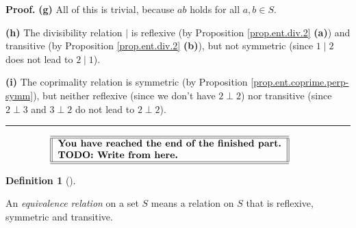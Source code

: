 \documentclass[numbers=enddot,12pt,final,onecolumn,notitlepage]{scrartcl}%
\numberwithin{exer}{subsection}
\theoremstyle{definition}
\newtheorem{defi}[theo]{Definition}
\newenvironment{definition}[1][]
{\begin{defi}[#1]\begin{leftbar}}
{\end{leftbar}\end{defi}}
\newenvironment{proof}[1][Proof]{\noindent\textbf{#1.} }{\ \rule{0.5em}{0.5em}}
\begin{document}
\begin{proof}
\textbf{(g)} All of this is trivial, because $a$$b$ holds for all
$a,b\in S$.

\textbf{(h)} The divisibility relation $\mid$ is reflexive (by Proposition
\ref{prop.ent.div.2} \textbf{(a)}) and transitive (by Proposition
\ref{prop.ent.div.2} \textbf{(b)}), but not symmetric (since $1\mid2$ does not
lead to $2\mid1$).

\textbf{(i)} The coprimality relation is symmetric (by Proposition
\ref{prop.ent.coprime.perp-symm}), but neither reflexive (since we don't have
$2\perp2$) nor transitive (since $2\perp3$ and $3\perp2$ do not lead to
$2\perp2$).
\end{proof}%

\[%
\begin{tabular}
[c]{||l||}\hline\hline
\textbf{You have reached the end of the finished part.}\\
\textbf{TODO: Write from here.}\\\hline\hline
\end{tabular}
\ \ \ \ \
\]


\begin{definition}
\label{def.eqrel.rel.eqrel}An \textit{equivalence relation} on a set $S$ means
a relation on $S$ that is reflexive, symmetric and transitive.
\end{definition}
\end{document}
